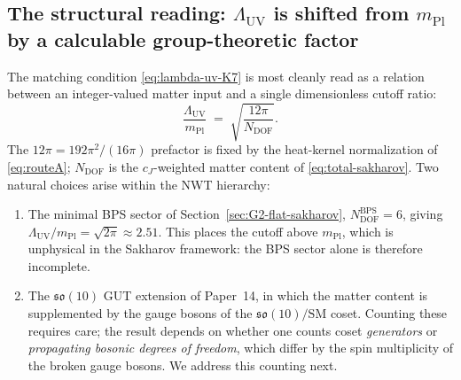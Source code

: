 \documentclass[11pt]{article}
\newcommand{\so}{\mathfrak{so}}
\newcommand{\mPl}{m_{\mathrm{Pl}}}
\begin{document}
\subsection{The structural reading: $\Lambda_{\mathrm{UV}}$ is shifted
            from $\mPl$ by a calculable group-theoretic factor}
\label{sec:G3-cutoff-shift}

The matching condition \eqref{eq:lambda-uv-K7} is most cleanly read as
a relation between an integer-valued matter input and a single
dimensionless cutoff ratio:
\begin{equation}
  \boxed{\;
    \frac{\Lambda_{\mathrm{UV}}}{\mPl}
     \;=\;
     \sqrt{\frac{12\pi}{N_{\mathrm{DOF}}}}.
  \;}
  \label{eq:cutoff-shift}
\end{equation}
The $12\pi = 192\pi^2/(16\pi)$ prefactor is fixed by the heat-kernel
normalization of \eqref{eq:routeA}; $N_{\mathrm{DOF}}$ is the
$c_J$-weighted matter content of \eqref{eq:total-sakharov}.  Two
natural choices arise within the NWT hierarchy:
\begin{enumerate}
\item The minimal BPS sector of Section~\ref{sec:G2-flat-sakharov},
      $N_{\mathrm{DOF}}^{\mathrm{BPS}} = 6$, giving
      $\Lambda_{\mathrm{UV}}/\mPl = \sqrt{2\pi} \approx 2.51$.
      This places the cutoff above $\mPl$, which is unphysical in the
      Sakharov framework: the BPS sector alone is therefore
      incomplete.
\item The $\so(10)$ GUT extension of Paper~14, in which the matter
      content is supplemented by the gauge bosons of the
      $\so(10)/\mathrm{SM}$ coset.  Counting these requires care; the
      result depends on whether one counts coset \emph{generators} or
      \emph{propagating bosonic degrees of freedom}, which differ by
      the spin multiplicity of the broken gauge bosons.  We address
      this counting next.
\end{enumerate}
\end{document}
